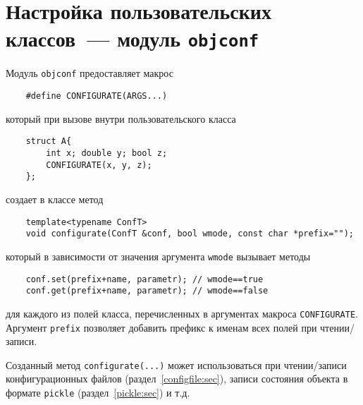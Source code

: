 \section{Настройка пользовательских классов~--- модуль {\tt objconf}}\label{objconf:sec}
Модуль \verb'objconf' предоставляет макрос
\begin{verbatim}
    #define CONFIGURATE(ARGS...)
\end{verbatim}
который при вызове внутри пользовательского класса
\begin{verbatim}
    struct A{
        int x; double y; bool z;
        CONFIGURATE(x, y, z);
    };
\end{verbatim}
создает в классе метод
\begin{verbatim}
    template<typename ConfT>					
    void configurate(ConfT &conf, bool wmode, const char *prefix="");
\end{verbatim}
который в зависимости от значения аргумента \verb'wmode' вызывает методы
\begin{verbatim}
    conf.set(prefix+name, parametr); // wmode==true
    conf.get(prefix+name, parametr); // wmode==false
\end{verbatim}
для каждого из полей класса, перечисленных в аргументах макроса \verb'CONFIGURATE'.
Аргумент \verb'prefix' позволяет добавить префикс к именам всех полей при чтении/записи.

Созданный метод \verb'configurate(...)' может использоваться при чтении/записи конфигурационных файлов (раздел~\ref{configfile:sec}),
записи состояния объекта в формате \verb'pickle' (раздел~\ref{pickle:sec}) и т.д.
